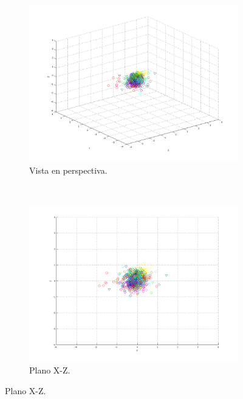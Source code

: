 \documentclass[informe.tex]{subfiles}
\begin{document}
      
      
      
      
      
      
      
      
      
      
      
      
      
      
      
      
      
      
      
      
      
      
	\begin{figure}[H]
        \centering
        \hspace*{-6.5cm}
        \begin{subfigure}[b]{0.49\textwidth}
                \includegraphics[width=\textwidth]{graficos/fold1_criterioParadap_reglas_alpha0_rep1_0P.png}
                \caption{Vista en perspectiva.}
        \end{subfigure}%
        ~
        \begin{subfigure}[b]{0.49\textwidth}
                \includegraphics[width=\textwidth]{graficos/fold1_criterioParadap_reglas_alpha0_rep1_1XZ.png}
                \caption{Plano X-Z.}
        \end{subfigure}
        

\end{figure}
\end{document}
